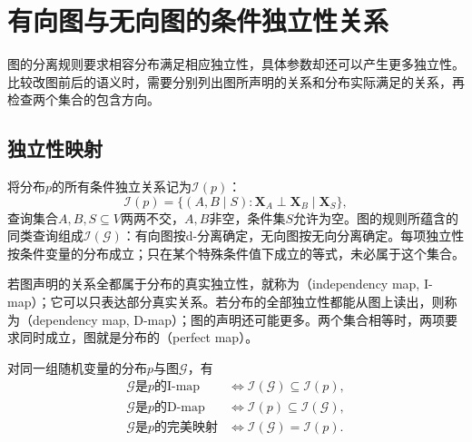 \section{有向图与无向图的条件独立性关系}
\label{sec:pgm-representations-independence}

图的分离规则要求相容分布满足相应独立性，具体参数却还可以产生更多独立性。比较改图前后的语义时，需要分别列出图所声明的关系和分布实际满足的关系，再检查两个集合的包含方向。

\subsection{独立性映射}
\label{sec:pgm-representations-maps}

将分布$p$的所有条件独立关系记为$\mathcal{I}(p)$：
\begin{equation}
  \mathcal{I}(p)
  =
  \bigl\{(A,B\mid S):
  \bm{X}_A\perp\bm{X}_B\mid\bm{X}_S\bigr\},
  \label{eq:pgm-representations-distribution-independences}
\end{equation}
查询集合$A,B,S\subseteq V$两两不交，$A,B$非空，条件集$S$允许为空。图的规则所蕴含的同类查询组成$\mathcal{I}(\mathcal{G})$：有向图按d-分离确定，无向图按无向分离确定。每项独立性按条件变量的分布成立；只在某个特殊条件值下成立的等式，未必属于这个集合。

若图声明的关系全都属于分布的真实独立性，就称为（independency map, I-map）；它可以只表达部分真实关系。若分布的全部独立性都能从图上读出，则称为（dependency map, D-map）；图的声明还可能更多。两个集合相等时，两项要求同时成立，图就是分布的（perfect map）。

\begin{definition}[三类独立性映射]
  \label{def:pgm-representations-maps}
  对同一组随机变量的分布$p$与图$\mathcal{G}$，有
  \begin{equation}
    \begin{aligned}
      \mathcal{G}\text{是}p\text{的I-map}
      &\iff \mathcal{I}(\mathcal{G})\subseteq\mathcal{I}(p),\\
      \mathcal{G}\text{是}p\text{的D-map}
      &\iff \mathcal{I}(p)\subseteq\mathcal{I}(\mathcal{G}),\\
      \mathcal{G}\text{是}p\text{的完美映射}
      &\iff \mathcal{I}(\mathcal{G})=\mathcal{I}(p).
    \end{aligned}
    \label{eq:pgm-representations-map-inclusions}
  \end{equation}
\end{definition}

